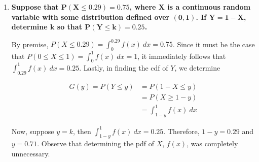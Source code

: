 \documentclass[10pt, oneside]{article}
\begin{document}
\begin{enumerate}[label=5.\arabic*]
By uniform distribution, $f(v) = \frac{1}{10}, 10 < X < 20$. We first determine the cdf of $X$:

\begin{align*}
G(x) = P(X \leq x) &= P \Big( \frac{1}{2} dV^2 \leq x \Big) \\
&= P \Big( V \leq \Big( \frac{2X}{d} \Big)^{1/2} \Big) \\
&= \int^{(\frac{2X}{d})^{1/2}}_{10} \frac{1}{10} \ dv = \frac{1}{10} \Big( \frac{2X}{d} \Big)^{1/2} - 1
\end{align*}

The pdf of $X$ is then:

\begin{align*}
G'(x) = g(x) = \frac{1}{20} \Big( \frac{2}{d} \Big) \Big( \frac{2X}{d} \Big)^{-1/2} = \boxed{ \frac{1}{10d} \Big( \frac{2X}{d} \Big)^{-1/2}, 50d < X < 200d }
\end{align*}

Which is clearly positive for $X \in (50d, 200d)$, and it also follows that $\int^{200d}_{50d} \frac{1}{10d} \Big( \frac{2X}{d} \Big)^{-1/2} \ dx = \boxed{1}$.

\item  \begin{tcolorbox}[
  colback=Cerulean!5!white,
  colframe=Cerulean!75!black]
\textbf{Suppose that $\bm{P(X \leq 0.29) = 0.75}$, where $\bm{X}$ is a continuous random variable with some distribution defined over $\bm{(0,1)}$. If $\bm{Y = 1 - X}$, determine $\bm{k}$ so that $\bm{P(Y \leq k) = 0.25}$.}
\end{tcolorbox}

By premise, $P(X \leq 0.29) = \int^{0.29}_0 f(x) \ dx = 0.75$. Since it must be the case that $P(0 \leq X \leq 1) = \int^1_0 f(x) \ dx = 1$, it immediately follows that $\int^1_{0.29} f(x) \ dx = 0.25$. Lastly, in finding the cdf of $Y$, we determine

\begin{align*}
G(y) = P(Y \leq y) &= P(1 - X \leq y) \\
&= P(X \geq 1 - y) \\
&= \int^1_{1-y} f(x) \ dx
\end{align*}

Now, suppose $y = k$, then $\int^1_{1-y} f(x) \ dx = 0.25$. Therefore, $1 - y = 0.29$ and $\boxed{y = 0.71}$. Observe that determining the pdf of $X$, $f(x)$, was completely unnecessary.

\end{enumerate}
\end{document}
